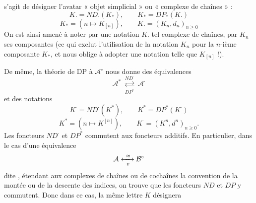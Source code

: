 \documentclass[11pt,a4paper]{article}
\begin{document}
s'agit de désigner l'avatar « objet simplicial » ou « complexe de chaînes » :
\[
  K. = ND.(K_{*}), \qquad K_{*} = DP_{*}(K.)
\]
\[
  K_{*} = (n \mapsto K_{[n]}), \qquad K. = (K_{n}, d_{n})_{n \geqslant 0}
\]
On est ainsi amené à noter par une notation $K.$ tel complexe de chaînes, par $K_{n}$
ses composantes (ce qui exclut l'utilisation de la notation $K_{n}$ pour la
$n$-ième composante  $K_{*}$, et nous oblige à adopter une notation telle
que $K_{[n]}$ !).

De même, la théorie de DP  à $\mathcal{A}^{\circ}$ nous donne
des équivalences
\[
  \mathcal{A}^{*} \;\underset{DP^{*}}{\overset{ND^{\cdot}}{\rightleftarrows}}\; \mathcal{A}^{\cdot}
\]
et des notations
\[
  K^{\cdot} = ND^{\cdot}(K^{*}), \qquad K^{*} = DP^{*}(K^{\cdot})
\]
\[
  K^{*} = (n \mapsto K^{[n]}), \qquad K^{\cdot} = (K^{n}, d^{n})_{n \geqslant 0} .
\]
Les foncteurs $ND^{\cdot}$ et $DP^{*}$ commutent aux foncteurs additifs. En
particulier, dans le cas d'une équivalence
\[
  \mathcal{A} \xleftrightarrow[\ v\ ]{\ \approx\ } \mathcal{B}^{\circ}
\]
dite , étendant aux complexes de chaînes ou de cochaînes la
convention de la montée ou de la descente des indices, on trouve que les foncteurs
$ND$ et $DP$ y commutent. Donc dans ce cas, la même lettre $K$ désignera
\end{document}
